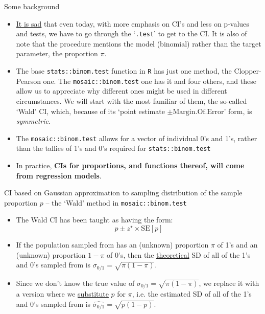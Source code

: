 \documentclass{beamer}\usepackage[]{graphicx}\usepackage[]{color}
\begin{document}
\begin{frame}{Some background}
\small

\begin{itemize}
	\item \underline{It is sad} that even today, with more emphasis on CI's and less on p-values and tests, we have to go through the `\texttt{.test}' to get to the CI. It is also of note that the procedure mentions the model (binomial) rather than the target parameter, the proportion $\pi.$ \pause
	
	\item The base \texttt{stats::binom.test} function in \texttt{R} has just one method, the Clopper-Pearson one. The \texttt{mosaic::binom.test} one has it and four others, and these allow us to appreciate why different ones might be used in different circumstances. We will start with the most familiar of them, the so-called `Wald' CI, which, because of its `point estimate $\pm \textrm{Margin.Of.Error}$' form, is \textit{symmetric}. \pause 
	
	\item The \texttt{mosaic::binom.test} allows for a vector of individual 0's and 1's, rather than the tallies of 1's and 0's required for \texttt{stats::binom.test} \pause 
	
	\item In practice, \textbf{CIs for proportions, and functions thereof, will come from regression models}. 
	
\end{itemize}
\end{frame}


\begin{frame}{CI based on Gaussian approximation to sampling distribution of the sample proportion $p$ -- the `Wald' method in \texttt{mosaic::binom.test}}
\small
\begin{itemize}
	\item The Wald CI has been taught as having the form: $$p \pm z^\star \times \textrm{SE}[p]$$ \pause
\item If the population sampled from has an (unknown) proportion $\pi$ of 1's
and an (unknown) proportion $1-\pi$ of 0's, then the \underline{theoretical} SD of all of the 1's and 0's sampled from is $\sigma_{0/1} = \sqrt{\pi(1-\pi)}$. \pause
\item Since we don't know the true value of $\sigma_{0/1} = \sqrt{\pi(1-\pi)}$, we replace it with a version where we \underline{substitute} $p$ for $\pi$, i.e. the estimated SD of all of the 1's and 0's sampled from is $\widehat{\sigma_{0/1}} = \sqrt{p(1-p)}$.

\end{itemize}

\end{frame}
\end{document}
